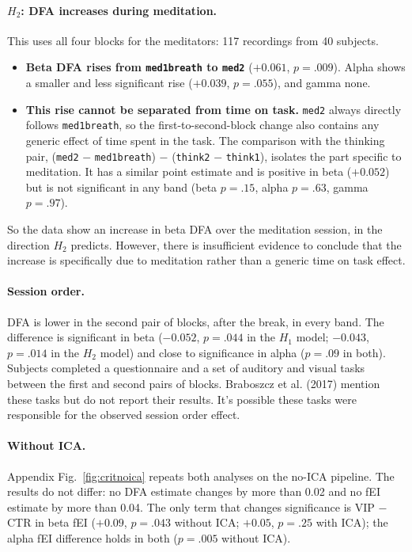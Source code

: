 \documentclass[10pt,a4paper]{article}
\begin{document}
\paragraph{$H_2$: DFA increases during meditation.} This uses all four blocks for the meditators: 117 recordings
from 40 subjects.
\begin{itemize}
  \item \textbf{Beta DFA rises from \texttt{med1breath} to \texttt{med2}} ($+0.061$, $p = .009$). Alpha shows a
        smaller and less significant rise ($+0.039$, $p = .055$), and gamma none.
  \item \textbf{This rise cannot be separated from time on task.} \texttt{med2} always directly follows
        \texttt{med1breath}, so the first-to-second-block change also contains any generic effect of time spent in
        the task. The comparison with the thinking pair, (\texttt{med2} $-$ \texttt{med1breath}) $-$
        (\texttt{think2} $-$ \texttt{think1}), isolates the part specific to meditation. It has a similar point 
        estimate and is positive in beta ($+0.052$) but is not significant in any band (beta $p = .15$, 
        alpha $p = .63$, gamma $p = .97$).
\end{itemize}
So the data show an increase in beta DFA over the meditation session, in the direction $H_2$ predicts. However, there
is insufficient evidence to conclude that the increase is specifically due to meditation rather than a generic time
on task effect.

\paragraph{Session order.} DFA is lower in the second pair of blocks, after the break, in every band. The difference
is significant in beta ($-0.052$, $p = .044$ in the $H_1$ model; $-0.043$, $p = .014$ in the $H_2$ model) and
close to significance in alpha ($p = .09$ in both). Subjects completed a questionnaire and a set of auditory and visual tasks between 
the first and second 
pairs of blocks. Braboszcz et al. (2017) mention these tasks but do not report their results. It's possible these tasks were responsible for the observed session order effect.

\paragraph{Without ICA.} Appendix Fig.~\ref{fig:critnoica} repeats both analyses on the no-ICA pipeline. The
results do not differ: no DFA estimate changes by more than 0.02 and no fEI estimate by more than 0.04. The only
term that changes significance is VIP $-$ CTR in beta fEI ($+0.09$, $p = .043$ without ICA; $+0.05$, $p = .25$
with ICA); the alpha fEI difference holds in both ($p = .005$ without ICA).
\end{document}
